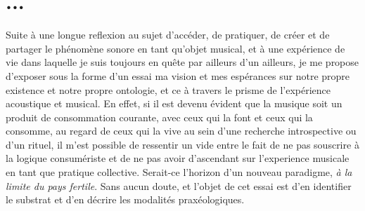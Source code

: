 \documentclass{article}
\begin{document}
\bigskip

\section{...}
Suite à une longue reflexion au sujet d'accéder, de pratiquer, de créer et de partager le phénomène sonore en tant qu'objet musical, et à une expérience de vie dans laquelle je suis toujours en quête par ailleurs d'un ailleurs, 
 je me propose d'exposer sous la forme d'un essai ma vision et mes espérances sur notre propre existence et notre propre ontologie, et ce à travers le prisme de l'expérience acoustique et musical. En effet, si il est devenu évident que la musique soit un produit de consommation courante, avec ceux qui la font et ceux qui la consomme, au regard de ceux qui la vive au sein d'une recherche introspective ou d'un rituel,
il m'est possible de ressentir un vide entre le fait de ne pas souscrire à la logique consumériste et de ne pas avoir d'ascendant sur l'experience musicale en tant que pratique collective.
Serait-ce l'horizon d'un nouveau paradigme, \textit{à la limite du pays fertile}. Sans aucun doute, et l'objet de cet essai est d'en identifier le substrat et d'en décrire les modalités praxéologiques\label{efn:pr}. 
\end{document}
